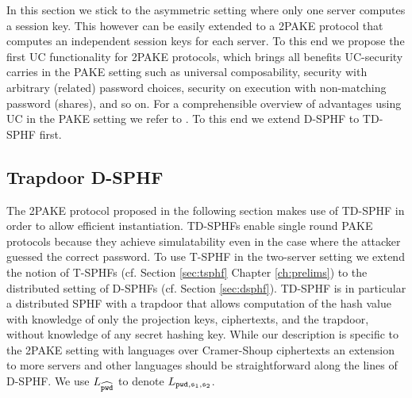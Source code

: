 In this section we stick to the asymmetric setting where only one server computes a session key.
This however can be easily extended to a \ac{2PAKE} protocol that computes an independent session keys for each server.
To this end we propose the first \ac{UC} functionality for \ac{2PAKE} protocols, which brings all benefits \ac{UC}-security carries in the \ac{PAKE} setting such as universal composability, security with arbitrary (related) password choices, security on execution with non-matching password (shares), and so on.
For a comprehensible overview of advantages using \ac{UC} in the \ac{PAKE} setting we refer to \citet{Canetti2005}.
To this end we extend \ac{D-SPHF} to \ac{TD-SPHF} first.


\subsection{Trapdoor D-SPHF}\label{sec:tdsphf}
The \ac{2PAKE} protocol proposed in the following section makes use of \ac{TD-SPHF} in order to allow efficient instantiation.
\acp{TD-SPHF} enable single round \ac{PAKE} protocols because they achieve simulatability even in the case where the attacker guessed the correct password.
To use \ac{T-SPHF} in the two-server setting we extend the notion of \acp{T-SPHF} (cf. Section \ref{sec:tsphf} Chapter \ref{ch:prelims}) to the distributed setting of \acp{D-SPHF} (cf. Section \ref{sec:dsphf}).
\ac{TD-SPHF} is in particular a distributed \ac{SPHF} with a trapdoor that allows computation of the hash value with knowledge of only the projection keys, ciphertexts, and the trapdoor, \ie without knowledge of any secret hashing key.
While our description is specific to the \ac{2PAKE} setting with languages over Cramer-Shoup ciphertexts an extension to more servers and other languages should be straightforward along the lines of \ac{D-SPHF}.
We use $L_{\widehat{\mathtt{pwd}}}$ to denote $L_{\mathtt{pwd}, \mathfrak{s}_1, \mathfrak{s}_2}$.


